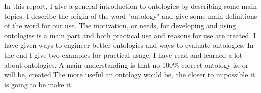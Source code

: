 In this report, I give a general introduction to ontologies by describing some main topics. I describe the origin of the word "ontology" and give some main definitions of the word for our use. The motivation, or needs, for developing and using ontologies is a main part and both practical use and reasons for use are treated. I have given ways to engineer better ontologies and ways to evaluate ontologies. In the end I give two examples for practical usage. I have read and learned a lot about ontologies. A main understanding is that no 100\% correct ontology is, or will be, created.The more useful an ontology would be, the closer to impossible it is going to be make it.